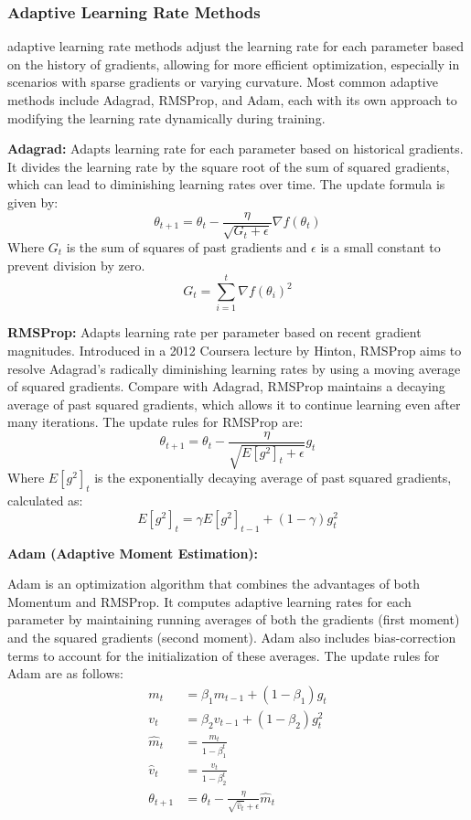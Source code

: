 \documentclass[
  letterpaper,
  DIV=11,
  numbers=noendperiod]{scrreprt}
\begin{document}
\subsubsection{Adaptive Learning Rate
Methods}\label{adaptive-learning-rate-methods}

adaptive learning rate methods adjust the learning rate for each
parameter based on the history of gradients, allowing for more efficient
optimization, especially in scenarios with sparse gradients or varying
curvature. Most common adaptive methods include Adagrad, RMSProp, and
Adam, each with its own approach to modifying the learning rate
dynamically during training.

\textbf{Adagrad:} Adapts learning rate for each parameter based on
historical gradients. It divides the learning rate by the square root of
the sum of squared gradients, which can lead to diminishing learning
rates over time. The update formula is given by: \[
\theta_{t+1} = \theta_t - \frac{\eta}{\sqrt{G_t + \epsilon}} \nabla f(\theta_t)
\] Where \(G_t\) is the sum of squares of past gradients and
\(\epsilon\) is a small constant to prevent division by zero. \[
G_t = \sum_{i=1}^t \nabla f(\theta_i)^2
\]

\textbf{RMSProp:} Adapts learning rate per parameter based on recent
gradient magnitudes. Introduced in a 2012 Coursera lecture by Hinton,
RMSProp aims to resolve Adagrad's radically diminishing learning rates
by using a moving average of squared gradients. Compare with Adagrad,
RMSProp maintains a decaying average of past squared gradients, which
allows it to continue learning even after many iterations. The update
rules for RMSProp are:\\
\[
\theta_{t+1} = \theta_t - \frac{\eta}{\sqrt{E[g^2]_t + \epsilon}} g_t
\] Where \(E[g^2]_t\) is the exponentially decaying average of past
squared gradients, calculated as:\\
\[E[g^2]_t = \gamma E[g^2]_{t-1} + (1 - \gamma) g_t^2\]

\textbf{Adam (Adaptive Moment Estimation):}

Adam is an optimization algorithm that combines the advantages of both
Momentum and RMSProp. It computes adaptive learning rates for each
parameter by maintaining running averages of both the gradients (first
moment) and the squared gradients (second moment). Adam also includes
bias-correction terms to account for the initialization of these
averages. The update rules for Adam are as follows: \[\begin{aligned}
m_t &= \beta_1 m_{t-1} + (1 - \beta_1) g_t \\
v_t &= \beta_2 v_{t-1} + (1 - \beta_2) g_t^2 \\
\hat{m}_t &= \frac{m_t}{1 - \beta_1^t} \\
\hat{v}_t &= \frac{v_t}{1 - \beta_2^t} \\
\theta_{t+1} &= \theta_t - \frac{\eta}{\sqrt{\hat{v}_t} + \epsilon} \hat{m}_t
\end{aligned}
\]
\end{document}
